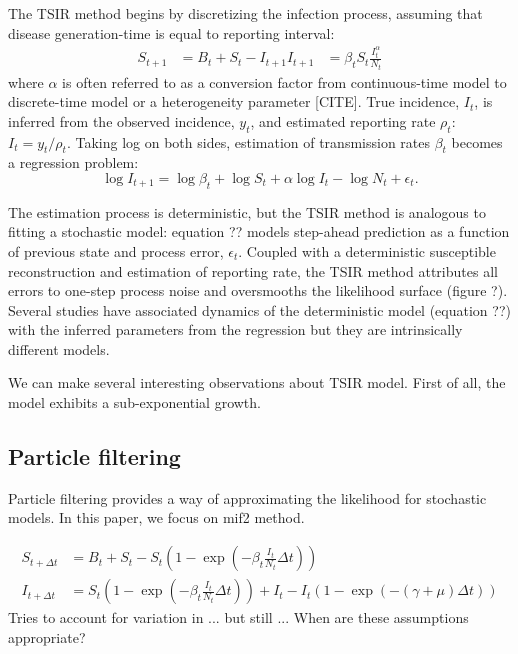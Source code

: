 \documentclass{article}
\begin{document}
The TSIR method begins by discretizing the infection process, assuming that disease generation-time is equal to reporting interval:
\begin{equation}
\begin{aligned}
S_{t+1} &= B_t + S_t - I_{t+1}
I_{t+1} &= \beta_t S_t \frac{I_t^\alpha}{N_t}
\end{aligned}
\end{equation}
where $\alpha$ is often referred to as a conversion factor from continuous-time model to discrete-time model or a heterogeneity parameter [CITE].
True incidence, $I_t$, is inferred from the observed incidence, $y_t$, and estimated reporting rate $\rho_t$: $I_t = y_t/\rho_t$.
Taking log on both sides, estimation of transmission rates $\beta_t$ becomes a regression problem:
\begin{equation}
\log I_{t + 1} = \log \beta_t + \log S_t + \alpha \log I_t - \log N_t + \epsilon_t.
\end{equation}

The estimation process is deterministic, but the TSIR method is analogous to fitting a stochastic model: 
equation ?? models step-ahead prediction as a function of previous state and process error, $\epsilon_t$. 
Coupled with a deterministic susceptible reconstruction and estimation of reporting rate, the TSIR method attributes all errors to one-step process noise and oversmooths the likelihood surface (figure ?).
Several studies have associated dynamics of the deterministic model (equation ??) with the inferred parameters from the regression but they are intrinsically different models.

We can make several interesting observations about TSIR model.
First of all, the model exhibits a sub-exponential growth.



\subsection{Particle filtering}

Particle filtering provides a way of approximating the likelihood for stochastic models.
In this paper, we focus on mif2 method.

\begin{equation}
\begin{aligned}
S_{t + \Delta t} &= B_t + S_t - S_t \left(1- \exp\left(-\beta_t \frac{I_t}{N_t} \Delta t\right)\right)\\
I_{t + \Delta t} &= S_t \left( 1- \exp\left(-\beta_t \frac{I_t}{N_t} \Delta t\right)\right) + I_t - I_t (1 - \exp(-(\gamma + \mu) \Delta t))
\end{aligned}
\end{equation}
Tries to account for variation in ... but still ... When are these assumptions appropriate?
\end{document}

